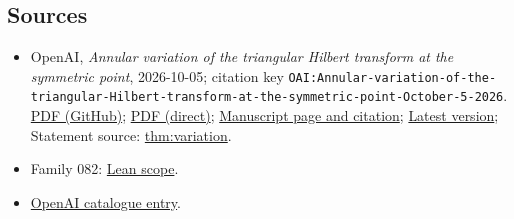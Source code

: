 \documentclass[11pt]{article}
\begin{document}
\subsection{Sources}
\begin{itemize}
\item OpenAI, \emph{Annular variation of the triangular Hilbert transform at the symmetric point}, 2026-10-05; citation key \texttt{OAI:Annular-variation-of-the-triangular-Hilbert-transform-at-the-symmetric-point-October-5-2026}. \href{https://github.com/openai/math/blob/adc7f1241b42e322a6451854ab7e4b4c146bf78a/preprints/Annular-variation-of-the-triangular-Hilbert-transform-at-the-symmetric-point-October-5-2026/annular-variation.pdf}{PDF (GitHub)}; \href{https://github.com/openai/math/raw/adc7f1241b42e322a6451854ab7e4b4c146bf78a/preprints/Annular-variation-of-the-triangular-Hilbert-transform-at-the-symmetric-point-October-5-2026/annular-variation.pdf}{PDF (direct)}; \href{https://github.com/openai/math/blob/adc7f1241b42e322a6451854ab7e4b4c146bf78a/preprints/Annular-variation-of-the-triangular-Hilbert-transform-at-the-symmetric-point-October-5-2026/README.md}{Manuscript page and citation}; \href{https://github.com/openai/math/blob/main/preprints/Annular-variation-of-the-triangular-Hilbert-transform-at-the-symmetric-point-October-5-2026/annular-variation.pdf}{Latest version}; Statement source: \href{https://github.com/openai/math/blob/adc7f1241b42e322a6451854ab7e4b4c146bf78a/preprints/Annular-variation-of-the-triangular-Hilbert-transform-at-the-symmetric-point-October-5-2026/build/sections/introduction.tex\#L27}{thm:variation}.
\item Family 082: \href{https://github.com/openai/math/blob/adc7f1241b42e322a6451854ab7e4b4c146bf78a/lean/docs/082.md}{Lean scope}.
\item \href{https://github.com/openai/math/blob/adc7f1241b42e322a6451854ab7e4b4c146bf78a/CONTENTS.md}{OpenAI catalogue entry}.
\end{itemize}
\end{document}
